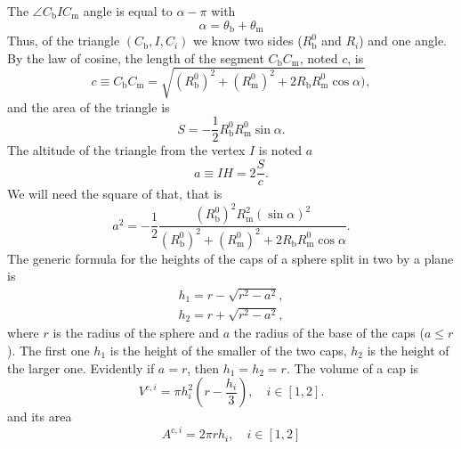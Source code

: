 \documentclass{article}
\begin{document}
The $\angle C_\text{b} I C_\text{m}$ angle is equal to $\alpha - \pi$ with
\begin{equation}
    \alpha = \theta_\text{b}+\theta_\text{m}
    \label{eq:alpha}
\end{equation}
Thus, of the triangle
$(C_\text{b},I,C_i)$ we know two sides ($R^0_\text{b}$ and $R_i$) and one angle. By the law of 
cosine, the length of the segment $C_\text{b}C_\text{m}$, noted $c$, is
\begin{equation}
    c \equiv C_\text{b}C_\text{m} =  \sqrt{\left(R^0_\text{b}\right)^2 +
        \left(R^0_\text{m}\right)^2 + 2R_\text{b}R^0_\text{m}\cos{\alpha})},
    \label{eq:c2}
\end{equation}
and the area of the triangle is 
\begin{equation}
    S = -\frac{1}{2}R^0_\text{b}R^0_\text{m}\sin{\alpha}.
    \label{eq:S2}
\end{equation}
The altitude of the triangle from the vertex $I$ is noted $a$
\begin{equation}
    a \equiv IH = 2\frac{S}{c}.
    \label{eq:a-}
\end{equation}
We will need the square of that, that is
\begin{equation}
    a^2 =
    -\frac{1}{2}
    \frac
    {\left(R^0_\text{b}\right)^2R_\text{m}^2(\sin{\alpha})^2}
    {\left(R^0_\text{b}\right)^2 + \left(R^0_\text{m}\right)^2 +
    2R_\text{b}R^0_\text{m}\cos{\alpha}}.
    \label{eq:a-2}
\end{equation}
The generic formula for the heights of the caps of a sphere split in two by a 
plane is
\begin{align}
    h_1 = r - \sqrt{r^2 - a^2}
    ,
    \label{eq:h1}
    \\
    h_2 = r + \sqrt{r^2 - a^2}
    ,
    \label{eq:h2}
\end{align}
where $r$ is the radius of the sphere and $a$ the radius of the base of the caps
($a \leq r$). The first one $h_1$ is the height of the smaller of the two
caps, $h_2$ is the height of the larger one. Evidently if $a=r$, then $h_1 = h_2
= r$.
The volume of a cap is
\begin{equation}
    V^{\text{c},i} = \pi h_i^2\left(r - \frac{h_i}{3}\right)
    , \quad i \in [1, 2]
    .
    \label{eq:V}
\end{equation}
and its area
\begin{equation}
    A^{\text{c},i} = 2\pi r h_i
    , \quad i \in [1, 2]
\end{equation}
\end{document}
